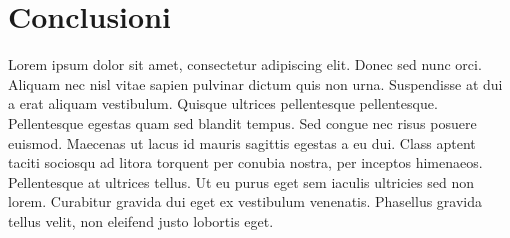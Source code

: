 \chapter{Conclusioni}
\label{cha:conclusioni}
Lorem ipsum dolor sit amet, consectetur adipiscing elit. Donec sed nunc orci. Aliquam nec nisl vitae sapien pulvinar dictum quis non urna. Suspendisse at dui a erat aliquam vestibulum. Quisque ultrices pellentesque pellentesque. Pellentesque egestas quam sed blandit tempus. Sed congue nec risus posuere euismod. Maecenas ut lacus id mauris sagittis egestas a eu dui. Class aptent taciti sociosqu ad litora torquent per conubia nostra, per inceptos himenaeos. Pellentesque at ultrices tellus. Ut eu purus eget sem iaculis ultricies sed non lorem. Curabitur gravida dui eget ex vestibulum venenatis. Phasellus gravida tellus velit, non eleifend justo lobortis eget.

